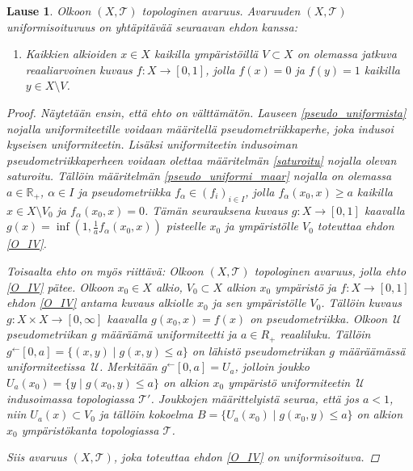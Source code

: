 \documentclass[12pt,a4paper,leqno]{report}
\newcommand{\R}{\mathbb{R}}
\newcommand{\U}{\,\mathcal{U}}
\newcommand{\T}{\mathcal{T}}
\theoremstyle{plain}
\newtheorem{lause}[equation]{Lause}
\theoremstyle{definition}
\theoremstyle{remark}
\begin{document}
\begin{lause}
Olkoon $(X,\T)$ topologinen avaruus.
Avaruuden $(X,\T)$ uniformisoituvuus on yhtäpitävää seuraavan ehdon kanssa:
\begin{enumerate} [label=(Z),ref=(Z)]
\item\label{O_IV} Kaikkien alkioiden $x\in X$ kaikilla 
ympäristöillä $V\subset X$ on olemassa jatkuva 
reaaliarvoinen kuvaus $f\colon X\rightarrow [0,1]$, 
jolla $f(x)=0$ ja $f(y)=1$ kaikilla $y\in X\setminus V$.
\end{enumerate}
\begin{proof}
Näytetään ensin, että ehto on välttämätön. 
Lauseen \ref{pseudo_uniformista} nojalla uniformiteetille voidaan 
määritellä pseudometriikkaperhe, joka indusoi kyseisen uniformiteetin. 
Lisäksi uniformiteetin indusoiman pseudometriikkaperheen voidaan olettaa määritelmän \ref{saturoitu} 
nojalla olevan saturoitu. 
Tällöin määritelmän \ref{pseudo_uniformi_maar} nojalla on olemassa $ a\in\R_+$, $\alpha\in I$ 
ja pseudometriikka $f_\alpha\in (f_i)_{i\in I}$, 
jolla $f_\alpha (x_0,x)\geq a$ kaikilla $x\in X\setminus V_0$ ja $f_\alpha(x_0,x)=0$. 
Tämän seurauksena kuvaus $g\colon X\to [0,1]$ kaavalla $g(x)=\inf \left( 1,\frac{1}{a}f_\alpha(x_0,x) \right)$ 
pisteelle $x_0$ ja ympäristölle $V_0$ toteuttaa ehdon \ref{O_IV}.

Toisaalta ehto on myös riittävä:
Olkoon $(X,\T)$ topologinen avaruus, jolla ehto \ref{O_IV} pätee. 
Olkoon $x_0\in X$ alkio, $V_0\subset X$ alkion $x_0$ ympäristö 
ja $f\colon X\rightarrow [0,1]$ ehdon \ref{O_IV} antama kuvaus alkiolle $x_0$ ja sen ympäristölle $V_0$. 
Tällöin kuvaus $g\colon X\times X\to [0,\infty]$ kaavalla $g(x_0,x)=f(x)$ on pseudometriikka. 
Olkoon $\U$ pseudometriikan $g$ määräämä uniformiteetti ja 
$ a\in R_+$ reaaliluku. 
Tällöin $g^\leftarrow[0,a]=\{(x,y)\mid g(x,y)\leq a\}$ on 
lähistö pseudometriikan $g$ määräämässä uniformiteetissa $\U$. 
Merkitään $g^\leftarrow[0,a]=U_a$, jolloin  
joukko $U_a(x_0)=\{y\mid g(x_0,y)\leq a\}$ on alkion $x_0$ ympäristö uniformiteetin $\U$ 
indusoimassa topologiassa $\T'$. 
Joukkojen määrittelyistä seuraa, että jos $a<1$, niin $U_a(x)\subset V_0$ ja tällöin kokoelma $B=\{U_a(x_0)\mid g(x_0,y)\leq a\}$ 
on alkion $x_0$ ympäristökanta topologiassa $\T$.
%

Siis avaruus $(X,\T)$, joka toteuttaa ehdon \ref{O_IV} on uniformisoituva.
\end{proof}
\end{lause}
\end{document}
